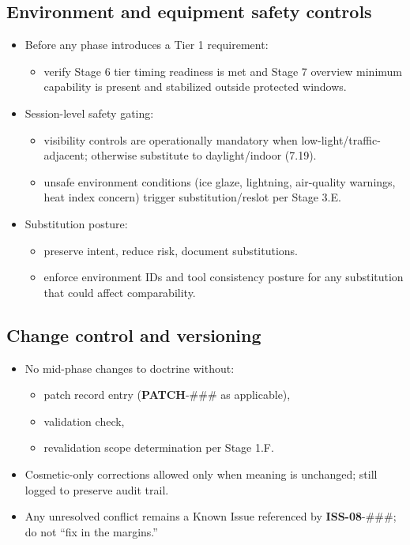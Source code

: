 \documentclass[10pt]{article}
\begin{document}
\subsection*{Environment and equipment safety controls}
{}

\begin{itemize}
\item Before any phase introduces a Tier 1 requirement:
  \begin{itemize}
  \item verify Stage 6 tier timing readiness is met and Stage 7 overview minimum capability is present and stabilized outside protected windows.
  \end{itemize}
\item Session-level safety gating:
  \begin{itemize}
  \item visibility controls are operationally mandatory when low-light/traffic-adjacent; otherwise substitute to daylight/indoor (7.19).
  \item unsafe environment conditions (ice glaze, lightning, air-quality warnings, heat index concern) trigger substitution/reslot per Stage 3.E.
  \end{itemize}
\item Substitution posture:
  \begin{itemize}
  \item preserve intent, reduce risk, document substitutions.
  \item enforce environment IDs and tool consistency posture for any substitution that could affect comparability.
  \end{itemize}
\end{itemize}

\subsection*{Change control and versioning}
{}

\begin{itemize}
\item No mid-phase changes to doctrine without:
  \begin{itemize}
  \item patch record entry (\textbf{PATCH}-\#\#\# as applicable),
  \item validation check,
  \item revalidation scope determination per Stage 1.F.
  \end{itemize}
\item Cosmetic-only corrections allowed only when meaning is unchanged; still logged to preserve audit trail.
\item Any unresolved conflict remains a Known Issue referenced by \textbf{ISS-08}-\#\#\#; do not “fix in the margins.”
\end{itemize}
\end{document}

